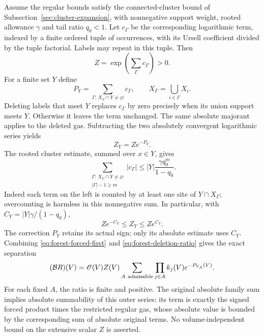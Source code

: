 Assume the regular bounds satisfy the connected-cluster bound of
Subsection~\ref{sec:cluster-expansion}, with nonnegative support weight,
rooted allowance $\gamma$ and tail ratio $q_0<1$. Let $c_\Gamma$ be
the corresponding logarithmic term, indexed by a finite ordered
tuple of occurrences, with its Ursell coefficient divided by the
tuple factorial. Labels may repeat in this tuple. Then
\[
                    Z=\exp\left(\sum_\Gamma c_\Gamma\right)>0.
\]
For a finite set $Y$ define
\[
        P_Y=\sum_{\Gamma:\,X_\Gamma\cap Y\ne\varnothing}c_\Gamma,
               \qquad X_\Gamma=\bigcup_{i\in\Gamma}X_i.
\]
Deleting labels that meet $Y$ replaces $c_\Gamma$ by zero precisely
when its union support meets $Y$. Otherwise it leaves the term
unchanged. The same absolute majorant applies to the deleted gas.
Subtracting the two absolutely convergent logarithmic series yields
\begin{equation}\label{eq:forest-deletion-ratio}
                         Z_Y=Z e^{-P_Y}.
\end{equation}
The rooted cluster estimate, summed over $x\in Y$, gives
\begin{equation}\label{eq:forest-deletion-price}
 \sum_{\substack{\Gamma:\,X_\Gamma\cap Y\ne\varnothing\\
                       |\Gamma|-1\ge m}}|c_\Gamma|
          \le |Y|\frac{\gamma q_0^m}{1-q_0}.
\end{equation}
Indeed each term on the left is counted by at least one site of
$Y\cap X_\Gamma$; overcounting is harmless in this nonnegative sum.
In particular, with $C_Y=|Y|\gamma/(1-q_0)$,
\[
                Ze^{-C_Y}\le Z_Y\le Ze^{C_Y}.
\]
The correction $P_Y$ retains its actual sign; only its absolute
estimate uses $C_Y$. Combining \eqref{eq:forest-forced-first} and
\eqref{eq:forest-deletion-ratio} gives the exact separation
\begin{equation}\label{eq:forest-regular-separated}
 (\mathcal BR)(V)=\mathscr O(V)Z(V)
       \sum_{A\ {\rm admissible}}\prod_{j\in A}k_j(V)e^{-P_{Y_A}(V)}.
\end{equation}
For each fixed $A$, the ratio is finite and positive. The original
absolute family sum implies absolute summability of this outer
series: its term is exactly the signed forced product times the
restricted regular gas, whose absolute value is bounded by the
corresponding sum of absolute original terms. No volume-independent
bound on the extensive scalar $Z$ is asserted.

